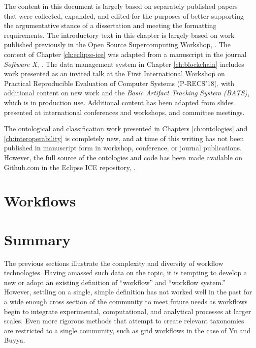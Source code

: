 The content in this document is largely based on separately published papers
that were collected, expanded, and edited for the purposes of better supporting
the argumentative stance of a dissertation and meeting the formatting
requirements. The introductory text in this chapter is largely based on
work published previously in the Open Source Supercomputing Workshop,
\cite{billings_toward_2017}. The content of Chapter \ref{ch:eclipse-ice} was
adapted from a manuscript in the journal \textit{Software X},
\cite{billings_eclipse_2017}. The data management system in Chapter
\ref{ch:blockchain} includes work presented as an invited talk at the First
International Workshop on Practical Reproducible Evaluation of Computer Systems
(P-RECS'18), with additional content on new work and the
\textit{Basic Artifact Tracking System (BATS)}, which is in production
use. Additional content has been adapted from slides presented at international
conferences and workshops, and committee meetings.

The ontological and classification work presented in Chapters
\ref{ch:ontologies} and \ref{ch:interoperability} is completely new, and at
time of this writing has not been published in manuscript form in
workshop, conference, or journal publications. However, the full source of the
ontologies and code has been made available on Github.com in the Eclipse ICE repository,
\cite{billings_ice}.


\section{Workflows}



\section{Summary}

The previous sections illustrate the complexity and diversity of workflow
technologies. Having amassed such data on the topic, it is tempting to develop
a new or adopt an existing definition of ``workflow'' and ``workflow system.''
However, settling on a single, simple definition has not worked well in the past
for a wide enough cross section of the community to meet future needs as workflows
begin to integrate experimental, computational, and analytical processes at
larger scales. Even more rigorous methods that attempt to create relevant
taxonomies are restricted to a single community, such as grid workflows in the
case of Yu and Buyya.

